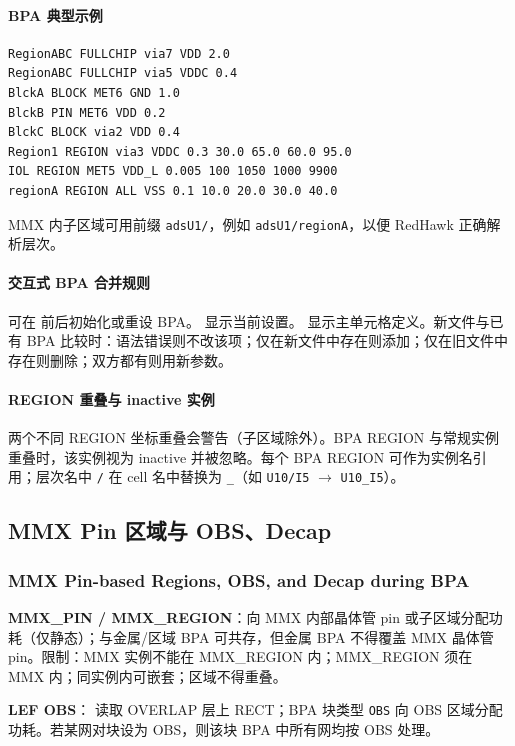 \paragraph{BPA 典型示例}
\begin{lstlisting}
RegionABC FULLCHIP via7 VDD 2.0
RegionABC FULLCHIP via5 VDDC 0.4
BlckA BLOCK MET6 GND 1.0
BlckB PIN MET6 VDD 0.2
BlckC BLOCK via2 VDD 0.4
Region1 REGION via3 VDDC 0.3 30.0 65.0 60.0 95.0
IOL REGION MET5 VDD_L 0.005 100 1050 1000 9900
regionA REGION ALL VSS 0.1 10.0 20.0 30.0 40.0
\end{lstlisting}

MMX 内子区域可用前缀 \texttt{adsU1/}，例如 \texttt{adsU1/regionA}，以便 RedHawk 正确解析层次。

\paragraph{交互式 BPA 合并规则}
 可在  前后初始化或重设 BPA。 显示当前设置。 显示主单元格定义。新文件与已有 BPA 比较时：语法错误则不改该项；仅在新文件中存在则添加；仅在旧文件中存在则删除；双方都有则用新参数。

\paragraph{REGION 重叠与 inactive 实例}
两个不同 REGION 坐标重叠会警告（子区域除外）。BPA REGION 与常规实例重叠时，该实例视为 inactive 并被忽略。每个 BPA REGION 可作为实例名引用；层次名中 \texttt{/} 在 cell 名中替换为 \texttt{\_}（如 \texttt{U10/I5} $\rightarrow$ \texttt{U10\_I5}）。
\subsection{MMX Pin 区域与 OBS、Decap}
\subsubsection*{MMX Pin-based Regions, OBS, and Decap during BPA}

\textbf{MMX\_PIN / MMX\_REGION}：向 MMX 内部晶体管 pin 或子区域分配功耗（仅静态）；与金属/区域 BPA 可共存，但金属 BPA 不得覆盖 MMX 晶体管 pin。限制：MMX 实例不能在 MMX\_REGION 内；MMX\_REGION 须在 MMX 内；同实例内可嵌套；区域不得重叠。

\textbf{LEF OBS}： 读取 OVERLAP 层上 RECT；BPA 块类型 \texttt{OBS} 向 OBS 区域分配功耗。若某网对块设为 OBS，则该块 BPA 中所有网均按 OBS 处理。

